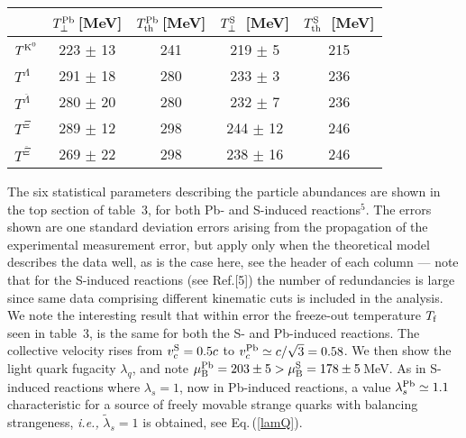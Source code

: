 \begin{mdframed}[linecolor=gray,roundcorner=12pt,backgroundcolor=Dandelion!15,linewidth=1pt,leftmargin=0cm,rightmargin=0cm,topline=true,bottomline=true,skipabove=12pt]
\begin{center}
\begin{tabular}{|l|cc|cc|}
\hline
 & $T_{\bot}^{\rm Pb}$\,[MeV]&$T_{\rm th}^{\rm Pb}$\,[MeV]&$T_{\bot}^{\rm S}$\ [MeV]&
  $T_{\rm th}^{\rm S}$\ [MeV]\\
\hline
$T^{{\rm K}^0}$ & 223 $\pm$ 13& 241& 219 $\pm$ \phantom{1}5 & 215\\
$T^\Lambda$ & 291 $\pm$ 18& 280& 233 $\pm$ \phantom{1}3 & 236\\
$T^{\overline\Lambda}$ & 280 $\pm$ 20& 280& 232 $\pm$ \phantom{1}7 & 236\\
$T^\Xi$ & 289 $\pm$ 12& 298& 244 $\pm$ 12& 246\\
$T^{\overline\Xi}$ & 269 $\pm$ 22& 298& 238 $\pm$ 16& 246\\
\hline
\end{tabular}
\end{center}

The six statistical parameters describing the particle abundances are shown in the top section of table~3, for both Pb- and S-induced reactions$^{5}$. The errors shown are one standard deviation errors arising from the propagation of the experimental measurement error, but apply only when the theoretical model describes the data well, as is the case here, see the header of each column --- note that for the S-induced reactions (see Ref.[5]) the number of redundancies is large since same data comprising different kinematic cuts is included in the analysis. We note the interesting result that within error the freeze-out temperature $T_{\rm f}$ seen in table~3, is the same for both the S- and Pb-induced reactions. The collective velocity rises from $v_c^{\rm S}=0.5c$ to $v_c^{\rm Pb}\simeq c/\sqrt{3}=0.58$. We then show the light quark fugacity $\lambda_{q}$, and note $\mu_\mathrm{B}^{\rm Pb}=203\pm5 >\mu_\mathrm{B}^{\rm S}=178\pm5$\,MeV. As in S-induced reactions where $\lambda_{s}=1$, now in Pb-induced reactions, a value $\lambda_{s}^{\rm Pb}\simeq 1.1$ characteristic for a source of freely movable strange quarks with balancing strangeness, {\it i.e.,} $\tilde\lambda_{s}=1$ is obtained, see Eq.\,(\ref{lamQ}).\\


\end{mdframed}
